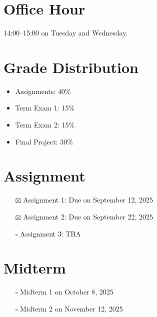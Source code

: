 \documentclass[
  letterpaper,
  DIV=11,
  numbers=noendperiod]{scrreprt}
\providecommand{\tightlist}{%
  \setlength{\itemsep}{0pt}\setlength{\parskip}{0pt}}
\begin{document}
\section*{Office Hour}\label{office-hour}


14:00--15:00 on Tuesday and Wednesday.

\section*{Grade Distribution}\label{grade-distribution}


\begin{itemize}
\tightlist
\item
  Assignments: 40\%
\item
  Term Exam 1: 15\%
\item
  Term Exam 2: 15\%
\item
  Final Project: 30\%
\end{itemize}

\section*{Assignment}\label{assignment}


\begin{itemize}
\tightlist
\item[$\boxtimes$]
  Assignment 1: Due on September 12, 2025
\item[$\boxtimes$]
  Assignment 2: Due on September 22, 2025
\item[$\square$]
  Assignment 3: TBA
\end{itemize}

\section*{Midterm}\label{midterm}


\begin{itemize}
\tightlist
\item[$\square$]
  Midterm 1 on October 8, 2025
\item[$\square$]
  Midterm 2 on November 12, 2025
\end{itemize}
\end{document}
